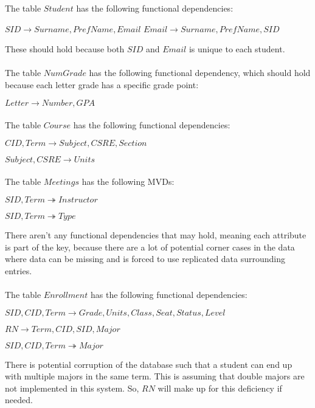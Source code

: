
The table $Student$ has the following functional dependencies:

$SID \rightarrow Surname, PrefName, Email$
$Email \rightarrow Surname, PrefName, SID$

These should hold because both $SID$ and $Email$ is unique to each student.
\\\\
The table $NumGrade$ has the following functional dependency, which should hold because each letter grade has a specific grade point:

$Letter \rightarrow Number, GPA$
\\\\
The table $Course$ has the following functional dependencies:

$CID, Term \rightarrow Subject, CSRE, Section$

$Subject, CSRE \rightarrow Units$
\\\\
The table $Meetings$ has the following MVDs:

$SID, Term \twoheadrightarrow Instructor$

$SID, Term \twoheadrightarrow Type$

There aren't any functional dependencies that may hold, meaning each attribute is part of the key, because there are a lot of potential corner cases in the data where data can be missing and is forced to use replicated data surrounding entries.
\\\\
The table $Enrollment$ has the following functional dependencies:

$SID, CID, Term \rightarrow Grade, Units, Class, Seat, Status, Level$

$RN \rightarrow Term, CID, SID, Major$

$SID, CID, Term \twoheadrightarrow Major$

There is potential corruption of the database such that a student can end up with multiple majors in the same term. This is assuming that double majors are not implemented in this system. So, $RN$ will make up for this deficiency if needed.